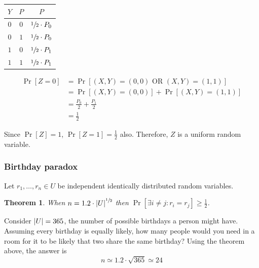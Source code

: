 \documentclass[10pt,a4paper]{report}
\newtheorem{theorem}{Theorem}[section]
\begin{document}
\begin{table}[H]
    \centering
    \begin{tabular}{c|c|c}
        $Y$ & $P$ & $P$\\
        \hline
        $0$ & $0$ & $\sfrac{1}{2} \cdot P_0$\\
        $0$ & $1$ & $\sfrac{1}{2} \cdot P_0$\\
        $1$ & $0$ & $\sfrac{1}{2} \cdot P_1$\\
        $1$ & $1$ & $\sfrac{1}{2} \cdot P_1$\\
    \end{tabular}
\end{table}

\begin{equation*}
\begin{aligned}
    \operatorname{Pr}[Z = 0] &= \operatorname{Pr}[(X, Y) = (0, 0) \text{ OR } (X, Y) = (1, 1)]\\
                             &= \operatorname{Pr}[(X, Y) = (0, 0)] +
                                \operatorname{Pr}[(X, Y) = (1, 1)]\\
                             &= \tfrac{P_0}{2} + \tfrac{P_1}{2}\\
                             &= \tfrac{1}{2}
\end{aligned}
\end{equation*}

Since $\operatorname{Pr}[Z] = 1$, $\operatorname{Pr}[Z = 1] = \tfrac{1}{2}$ also. Therefore, $Z$ is
a uniform random variable.

\subsubsection*{Birthday paradox}

Let $r_1, \ldots, r_n \in U$ be independent identically distributed random variables.

\begin{theorem}
    When $n = 1.2 \cdot \abs{U}^{\sfrac{1}{2}}$ then $\operatorname{Pr}[\exists i \ne j \colon r_i
    = r_j] \geq \tfrac{1}{2}$.
\end{theorem}

Consider $\abs{U} = 365$, the number of possible birthdays a person might have. Assuming every
birthday is equally likely, how many people would you need in a room for it to be likely that two
share the same birthday? Using the theorem above, the answer is
    $$ n \simeq 1.2 \cdot \sqrt{365} \simeq 24 $$
\end{document}
